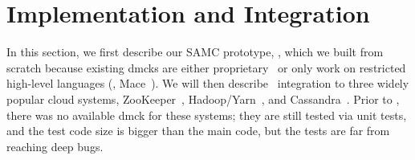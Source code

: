 \section{Implementation and Integration}
\label{sec-impl}

In this section, we first describe our SAMC prototype, \sampro, which we
built from scratch because existing dmcks are either
proprietary~\cite{Yang+09-Modist} or only work on restricted high-level
languages (\eg, Mace~\cite{Killian+07-LifeDeathMaceMC}).  We will then describe
\sampro\ integration to three widely popular cloud systems,
ZooKeeper~\cite{Hunt+10-ZooKeeperPaper}, Hadoop/Yarn~\cite{Kumar+13-Yarn},
and Cassandra~\cite{Lakshman+09-Cassandra}.  Prior to \sampro, there was no
available dmck for these systems; they are still tested via unit tests, and
the test code size is bigger than the main code, but the tests are far from
reaching deep bugs.


